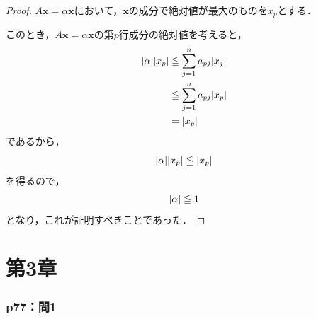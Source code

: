 \documentclass[a4paper,10pt,fleqn]{ltjsarticle}
\begin{document}
\begin{tleftbar}
    \begin{proof}
        $ A \bm{x}=\alpha \bm{x}$において，$\bm{x}$の成分で絶対値が最大のものを$x_p$とする．

        このとき，$ A \bm{x} = \alpha \bm{x}$の第$p$行成分の絶対値を考えると，
        \begin{align*}
            \abs{\alpha} \abs{x_p} & \leqq \sum_{j=1}^{n} a_{pj} \abs{x_j} \\
                                   & \leqq \sum_{j=1}^{n} a_{pj} \abs{x_p} \\
                                   & = \abs{x_p}
        \end{align*}
        であるから，
        \[
            \abs{\alpha} \abs{x_p} \leqq \abs{x_p}
        \]
        を得るので，
        \[
            \abs{\alpha} \leqq 1
        \]
        となり，これが証明すべきことであった．
    \end{proof}
\end{tleftbar}

\newpage


\part*{第3章}


\section*{p77：問1}

\end{document}

